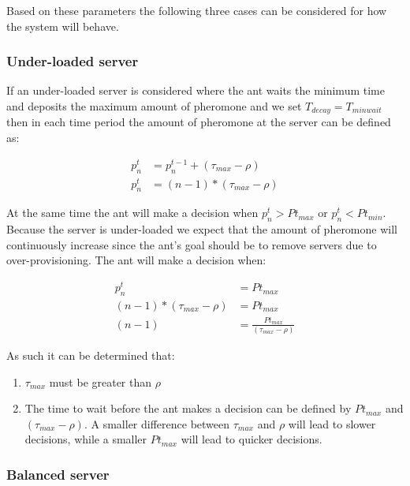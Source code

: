 \documentclass[conference]{IEEEtran}
\begin{document}
Based on these parameters the following three cases can be considered for how the system will behave.

\subsubsection{Under-loaded server}

If an under-loaded server is considered where the ant waits the minimum time and deposits the maximum amount of pheromone and we set $T_{decay} = T_{minwait}$ then in each time period the amount of pheromone at the server can be defined as:

\begin{equation}
\begin{aligned}
p^{t}_{n} &= p^{t-1}_{n} + (\tau_{max} - \rho) \\
p^{t}_{n} &= (n - 1) * (\tau_{max} - \rho)
\end{aligned}
\end{equation}

At the same time the ant will make a decision when $p^{t}_{n} > Pt_{max}$ or $p^{t}_{n} < Pt_{min}$. Because the server is under-loaded we expect that the amount of pheromone will continuously increase since the ant's goal should be to remove servers due to over-provisioning. The ant will make a decision when:

\begin{equation}
\begin{aligned}
p^{t}_{n} &= Pt_{max} \\
(n - 1) * (\tau_{max} - \rho) &= Pt_{max} \\
(n - 1) &= \frac{Pt_{max}}{(\tau_{max} - \rho)} 
\end{aligned}
\end{equation}

As such it can be determined that:

\begin{enumerate}
	\item $\tau_{max}$ must be greater than $\rho$
	\item The time to wait before the ant makes a decision can be defined by $Pt_{max}$ and $(\tau_{max} - \rho)$. A smaller difference between $\tau_{max}$ and $\rho$ will lead to slower decisions, while a smaller $Pt_{max}$ will lead to quicker decisions.
\end{enumerate}

\subsubsection{Balanced server}
\end{document}
